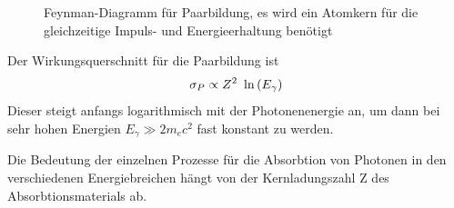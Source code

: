 \documentclass[Ex4_Zusammenfassung.tex]{subfiles}
\begin{document}
	\begin{figure} [H]
 		\centering 
 		\caption{Feynman-Diagramm für Paarbildung, es wird ein Atomkern für die gleichzeitige Impuls- und Energieerhaltung benötigt}
 	\end{figure}
 	
Der Wirkungsquerschnitt für die Paarbildung ist
\begin{equation}
	\sigma_{P} \propto Z^2 \  \ln \left( E_{\gamma}\right) 
\end{equation}
Dieser steigt anfangs logarithmisch mit der Photonenenergie an, um dann bei sehr hohen Energien $E_{\gamma} \gg 2 m_e c^2$ fast konstant zu werden.

Die Bedeutung der einzelnen Prozesse für die Absorbtion von Photonen in den verschiedenen Energiebreichen hängt von der Kernladungszahl Z des Absorbtionsmaterials ab. 
\end{document}
